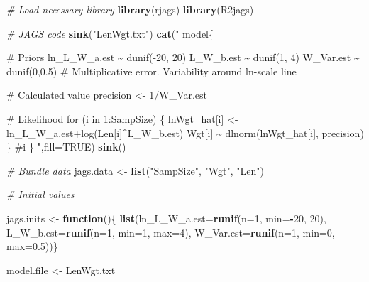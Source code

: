 \documentclass[
]{krantz}
\makeatletter
\newenvironment{Shaded}{\begin{snugshade}}{\end{snugshade}}
\newcommand{\AttributeTok}[1]{\textcolor[rgb]{0.27,0.27,0.27}{#1}}
\newcommand{\CommentTok}[1]{\textcolor[rgb]{0.37,0.37,0.37}{\textit{#1}}}
\newcommand{\ConstantTok}[1]{\textcolor[rgb]{0.37,0.37,0.37}{#1}}
\newcommand{\ControlFlowTok}[1]{\textcolor[rgb]{0.27,0.27,0.27}{\textbf{#1}}}
\newcommand{\DecValTok}[1]{\textcolor[rgb]{0.06,0.06,0.06}{#1}}
\newcommand{\FloatTok}[1]{\textcolor[rgb]{0.06,0.06,0.06}{#1}}
\newcommand{\FunctionTok}[1]{\textcolor[rgb]{0.27,0.27,0.27}{\textbf{#1}}}
\newcommand{\NormalTok}[1]{#1}
\newcommand{\OtherTok}[1]{\textcolor[rgb]{0.37,0.37,0.37}{#1}}
\newcommand{\SpecialCharTok}[1]{\textcolor[rgb]{0.43,0.43,0.43}{\textbf{#1}}}
\newcommand{\StringTok}[1]{\textcolor[rgb]{0.5,0.5,0.5}{#1}}
\newenvironment{kframe}{%
\medskip{}
\setlength{\fboxsep}{.8em}
 \def\at@end@of@kframe{}%
 \ifinner\ifhmode%
  \def\at@end@of@kframe{\end{minipage}}%
  \begin{minipage}{\columnwidth}%
 \fi\fi%
 \def\FrameCommand##1{\hskip\@totalleftmargin \hskip-\fboxsep
 \colorbox{shadecolor}{##1}\hskip-\fboxsep
     \hskip-\linewidth \hskip-\@totalleftmargin \hskip\columnwidth}%
 \MakeFramed {\advance\hsize-\width
   \@totalleftmargin\z@ \linewidth\hsize
   \@setminipage}}%
 {\par\unskip\endMakeFramed%
 \at@end@of@kframe}
\renewenvironment{Shaded}{\begin{kframe}}{\end{kframe}}
\makeatother
\begin{document}
\begin{Shaded}
\begin{Highlighting}[]
\CommentTok{\# Load necessary library}
\FunctionTok{library}\NormalTok{(rjags)}
\FunctionTok{library}\NormalTok{(R2jags)}

\CommentTok{\# JAGS code}
\FunctionTok{sink}\NormalTok{(}\StringTok{"LenWgt.txt"}\NormalTok{)}
\FunctionTok{cat}\NormalTok{(}\StringTok{"}
\StringTok{model\{}

\StringTok{\# Priors}
\StringTok{ ln\_L\_W\_a.est \textasciitilde{} dunif({-}20, 20)}
\StringTok{ L\_W\_b.est \textasciitilde{} dunif(1, 4)}
\StringTok{ W\_Var.est \textasciitilde{} dunif(0,0.5)   \# Multiplicative error. Variability around ln{-}scale line}

\StringTok{\# Calculated value}
\StringTok{ precision \textless{}{-} 1/W\_Var.est}

\StringTok{\# Likelihood}
\StringTok{ for (i in 1:SampSize) \{}
\StringTok{    lnWgt\_hat[i] \textless{}{-} ln\_L\_W\_a.est+log(Len[i]\^{}L\_W\_b.est)}
\StringTok{    Wgt[i] \textasciitilde{} dlnorm(lnWgt\_hat[i], precision)}
\StringTok{ \} \#i}
\StringTok{\}}
\StringTok{    "}\NormalTok{,}\AttributeTok{fill=}\ConstantTok{TRUE}\NormalTok{)}
\FunctionTok{sink}\NormalTok{()}

\CommentTok{\# Bundle data}
\NormalTok{jags.data }\OtherTok{\textless{}{-}} \FunctionTok{list}\NormalTok{(}\StringTok{"SampSize"}\NormalTok{, }\StringTok{"Wgt"}\NormalTok{, }\StringTok{"Len"}\NormalTok{)}

\CommentTok{\# Initial values}

\NormalTok{jags.inits }\OtherTok{\textless{}{-}} \ControlFlowTok{function}\NormalTok{()\{ }\FunctionTok{list}\NormalTok{(}\AttributeTok{ln\_L\_W\_a.est=}\FunctionTok{runif}\NormalTok{(}\AttributeTok{n=}\DecValTok{1}\NormalTok{, }\AttributeTok{min=}\SpecialCharTok{{-}}\DecValTok{20}\NormalTok{, }\DecValTok{20}\NormalTok{),}
                               \AttributeTok{L\_W\_b.est=}\FunctionTok{runif}\NormalTok{(}\AttributeTok{n=}\DecValTok{1}\NormalTok{, }\AttributeTok{min=}\DecValTok{1}\NormalTok{, }\AttributeTok{max=}\DecValTok{4}\NormalTok{),}
                               \AttributeTok{W\_Var.est=}\FunctionTok{runif}\NormalTok{(}\AttributeTok{n=}\DecValTok{1}\NormalTok{, }\AttributeTok{min=}\DecValTok{0}\NormalTok{, }\AttributeTok{max=}\FloatTok{0.5}\NormalTok{))\}}

\NormalTok{model.file }\OtherTok{\textless{}{-}} \StringTok{\textquotesingle{}LenWgt.txt\textquotesingle{}}


\end{Highlighting}
\end{Shaded}
\end{document}
